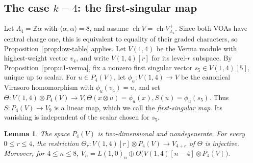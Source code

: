 \documentclass[10pt,a4paper]{amsart}
\numberwithin{equation}{section} \newtheorem{thm}{Theorem}[section] \newtheorem{lem}[thm]{Lemma} \newtheorem{ex}[thm]{Example} \newtheorem{prop}[thm]{Proposition} \newtheorem{cor}[thm]{Corollary} \newtheorem{defi}[thm]{Definition} \newtheorem{rmk}[thm]{Remark} \newtheorem{notation}[thm]{Notation}
\newcommand{\ch}{\operatorname{ch}}
\def\Z{\mathbb{Z}} \def\N{\mathbb{N}} \def\A{\mathbb{A}} \def\C{\mathbb{C}} \def\R{\mathbb{R}} \def\Q{\mathbb{Q}} \def\F{\mathbb{F}}
\begin{document}
\subsection{The case \texorpdfstring{$k=4$}{k=4}: the first-singular map}

Let $\Lambda_4=\Z\alpha$ with $\langle\alpha,\alpha\rangle=8$, and assume \(\ch V=\ch V_{\Lambda_4}^+.\) Since both VOAs have central charge one, this is equivalent to equality of their graded characters, so Proposition~\ref{prop:low-table} applies. Let $V(1,4)$ be the Verma module with highest-weight vector $v_4$, and write $V(1,4)[r]$ for its level-$r$ subspace. By Proposition~\ref{prop:c1-verma}, fix a nonzero first singular vector $s_5\in V(1,4)[5]$, unique up to scalar. For $u\in P_4(V)$, let \(\phi_u:V(1,4)\to V\) be the canonical Virasoro homomorphism with $\phi_u(v_4)=u$, and set \(\Theta:V(1,4)\otimes P_4(V)\longrightarrow V, \Theta(x\otimes u)=\phi_u(x), S(u)=\phi_u(s_5)\). Thus $S:P_4(V)\to V_9$ is a linear map, which we call the \emph{first-singular map}. Its vanishing is independent of the scalar chosen for $s_5$.

\begin{lem}\label{lem:k4-saturation8}
The space $P_4(V)$ is two-dimensional and nondegenerate. For every $0\le r\le4$, the restriction \(\Theta_r:V(1,4)[r]\otimes P_4(V)\longrightarrow V_{4+r}\) of $\Theta$ is injective. Moreover, for $4\le n\le8$, \(V_n=L(1,0)_n\oplus \Theta\bigl(V(1,4)[n-4]\otimes P_4(V)\bigr).\)
\end{lem}
\end{document}
